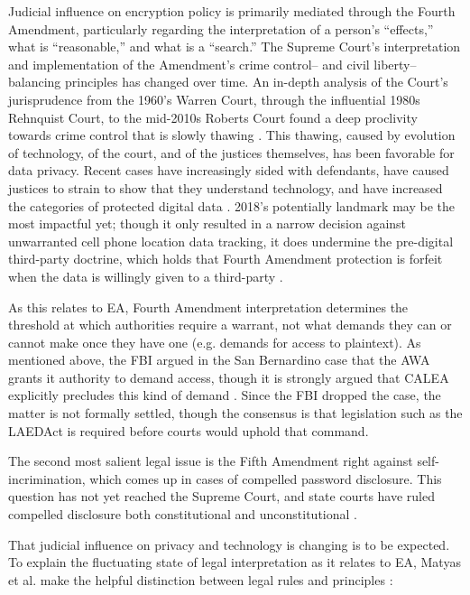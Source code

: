 Judicial influence on encryption policy is primarily mediated through the Fourth Amendment, particularly regarding the
interpretation of a person's ``effects,'' what is ``reasonable,'' and what is a ``search.'' The Supreme Court's
interpretation and implementation of the Amendment's crime control-- and civil liberty--balancing principles has changed
over time. An in-depth analysis of the Court's jurisprudence from the 1960's Warren Court, through the influential 1980s
Rehnquist Court, to the mid-2010s Roberts Court found a deep proclivity towards crime control that is slowly thawing
\cite{gizzi_fourth_2016}. This thawing, caused by evolution of technology, of the court, and of the justices themselves,
has been favorable for data privacy. Recent cases have increasingly sided with defendants, have caused justices to
strain to show that they understand technology, and have increased the categories of protected digital data
\cite{gizzi_fourth_2016}. 2018's potentially landmark  may be the most impactful yet;
though it only resulted in a narrow decision against unwarranted cell phone location data tracking, it does undermine
the pre-digital third-party doctrine, which holds that Fourth Amendment protection is forfeit when the data is willingly
given to a third-party \cite{franklin_2018}.

As this relates to \ac{EA}, Fourth Amendment interpretation determines the threshold at which authorities require a
warrant, not what demands they can or cannot make once they have one (e.g. demands for access to \ac{plaintext}). As
mentioned above, the FBI argued in the San Bernardino case that the \ac{AWA} grants it authority to demand access,
though it is strongly argued that \acs{CALEA} explicitly precludes this kind of demand \cite{gidari_2016}. Since the FBI
dropped the case, the matter is not formally settled, though the consensus is that legislation such as the \ac{LAEDAct}
is required before courts would uphold that command.

The second most salient legal issue is the Fifth Amendment right against self-incrimination, which comes up in cases of
compelled password disclosure. This question has not yet reached the Supreme Court, and state courts have ruled
compelled disclosure both constitutional \cite{sobel_2019} \cite{lee_nj_2020} and unconstitutional \cite{lee_its_2020}
\cite{vaas_2019}.

That judicial influence on privacy and technology is changing is to be expected. To explain the fluctuating state of
legal interpretation as it relates to \ac{EA}, Matyas et al. make the helpful distinction between legal rules and
principles \cite{matyas_incommensurability_2018}:

